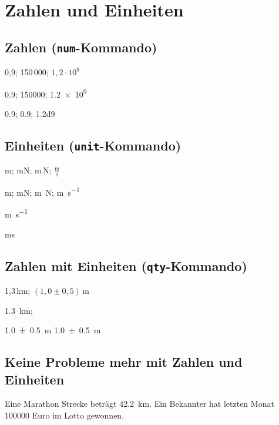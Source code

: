 \documentclass[11pt,a4paper,parskip]{scrartcl}
\begin{document}
%
\section{Zahlen und Einheiten}
%
\subsection{Zahlen (\texttt{num}-Kommando)}
0{,}9; 150\,000; $1{,}2\cdot 10^{9}$

\num{0,9}; \num{150000}; \num{1,2e9}

\num{0.9}; \num{.9}; \num{1.2d9}

%
\subsection{Einheiten (\texttt{unit}-Kommando)}
m; mN; m\,N; $\frac{\text{m}}{\text{s}}$

\unit{\meter}; \unit{\milli\newton}; \unit{\meter\newton};
\unit{\meter\per\second}

\unit[per-mode = fraction]{\meter\per\second}

\unit{\ms}

%
\subsection{Zahlen mit Einheiten (\texttt{qty}-Kommando)
}
1{,}3\,km; $(1{,}0 \pm 0{,}5)$\,m

\qty{1.3}{\kilo\meter};

\qty{1.0 +- 0.5}{\meter}
\qty[separate-uncertainty]{1.0 +- 0.5}{\meter}

\subsection{Keine Probleme mehr mit Zahlen und Einheiten}
Eine Marathon Strecke beträgt \qty{42.2}{\kilo\meter}.
Ein Bekannter hat letzten Monat $\num{100000}$ Euro im Lotto gewonnen.
\end{document}
